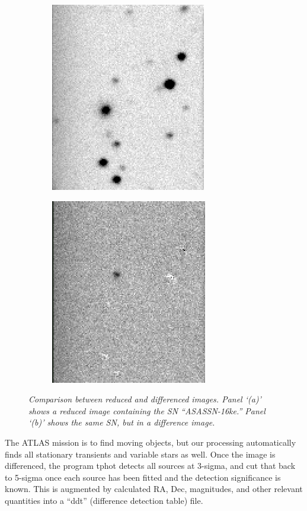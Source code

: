 \documentclass[aps,prb,twocolumn,superscriptaddress]{revtex4-1}
\begin{document}
\begin{figure}
  \centering
  \begin{subfigure}{.5\textwidth}
    \centering
    \includegraphics[width=0.5\linewidth]{figures/compare/red_ASASSN-16ke.png}
    \caption{\it \small{ }}
    \label{fig:red16ke}
  \end{subfigure}%
  \begin{subfigure}{.5\textwidth}
    \centering
      \includegraphics[width=0.5\linewidth]{figures/compare/diff_ASASSN-16ke.png}
    \caption{\it \small{ }}
    \label{fig:diff16ke}
  \end{subfigure}
  \caption{\it \small{Comparison between reduced and differenced images.  Panel `(a)' shows a reduced image containing the SN ``ASASSN-16ke.''  Panel `(b)' shows the same SN, but in a difference image.}}
  \label{fig:compreddiff}
\end{figure}

The ATLAS mission is to find moving objects, but our processing
automatically finds all stationary transients and variable stars as
well.  Once the image is differenced, the program tphot detects all
sources at 3-sigma, and cut that back to 5-sigma once each source
has been fitted and the detection significance is known.  
This is augmented by calculated RA, Dec, magnitudes, and other relevant
quantities into a ``ddt'' (difference detection table) file.
\end{document}
